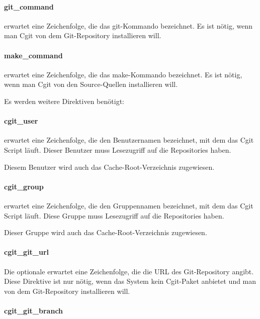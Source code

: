 \paragraph{git\_command}

 erwartet eine Zeichenfolge, die das git-Kommando bezeichnet.
Es ist nötig, wenn man Cgit von dem Git-Repository installieren will.

\paragraph{make\_command}

 erwartet eine Zeichenfolge, die das make-Kommando bezeichnet.
Es ist nötig, wenn man Cgit von den Source-Quellen installieren will.

Es werden weitere Direktiven benötigt:

\paragraph{cgit\_user}

 erwartet eine Zeichenfolge, die den Benutzernamen
bezeichnet, mit dem das Cgit Script läuft. Dieser Benutzer muss Lesezugriff auf
die Repositories haben.

Diesem Benutzer wird auch das Cache-Root-Verzeichnis zugewiesen.

\paragraph{cgit\_group}

 erwartet eine Zeichenfolge, die den Gruppennamen
bezeichnet, mit dem das Cgit Script läuft. Diese Gruppe muss Lesezugriff auf
die Repositories haben.

Dieser Gruppe wird auch das Cache-Root-Verzeichnis zugewiesen.

\paragraph{cgit\_git\_url}

Die optionale  erwartet eine Zeichenfolge, die die URL
des Git-Repository angibt. Diese Direktive ist nur nötig, wenn
das System kein Cgit-Paket anbietet und man von dem Git-Repository installieren will.

\paragraph{cgit\_git\_branch}

